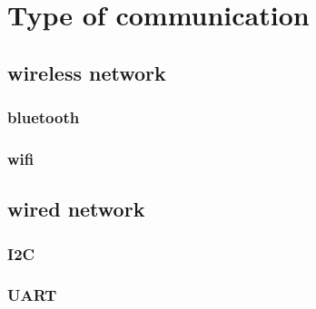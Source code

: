 \section{Type of communication}

\subsection{wireless network}
\subsubsection{bluetooth}

\subsubsection{wifi}

\subsection{wired network}

\subsubsection{I2C}
\subsubsection{UART}

